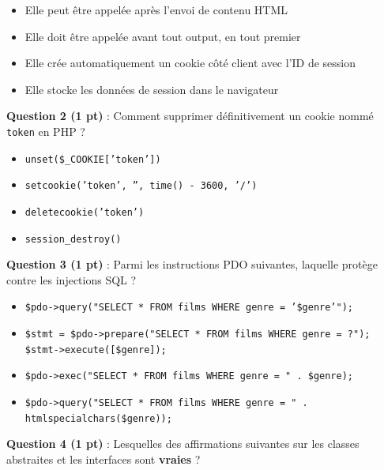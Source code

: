 \documentclass[11pt,a4paper]{article}
\newcommand{\cb}{$\square$\ }
\begin{document}
\begin{itemize}[leftmargin=2em, itemsep=3pt, topsep=4pt]
  \item[\cb] Elle peut être appelée après l'envoi de contenu HTML
  \item[\cb] Elle doit être appelée avant tout output, en tout premier
  \item[\cb] Elle crée automatiquement un cookie côté client avec l'ID de session
  \item[\cb] Elle stocke les données de session dans le navigateur
\end{itemize}

\vspace{6pt}

\noindent\textbf{Question 2 (1 pt)} : Comment supprimer définitivement un cookie nommé \texttt{token} en PHP ?

\begin{itemize}[leftmargin=2em, itemsep=3pt, topsep=4pt]
  \item[\cb] \texttt{unset(\$\_COOKIE['token'])}
  \item[\cb] \texttt{setcookie('token', '', time() - 3600, '/')}
  \item[\cb] \texttt{deletecookie('token')}
  \item[\cb] \texttt{session\_destroy()}
\end{itemize}

\vspace{6pt}

\noindent\textbf{Question 3 (1 pt)} : Parmi les instructions PDO suivantes, laquelle protège contre les injections SQL ?

\begin{itemize}[leftmargin=2em, itemsep=3pt, topsep=4pt]
  \item[\cb] \texttt{\$pdo->query("SELECT * FROM films WHERE genre = '\$genre'");}
  \item[\cb] \texttt{\$stmt = \$pdo->prepare("SELECT * FROM films WHERE genre = ?"); \$stmt->execute([\$genre]);}
  \item[\cb] \texttt{\$pdo->exec("SELECT * FROM films WHERE genre = " . \$genre);}
  \item[\cb] \texttt{\$pdo->query("SELECT * FROM films WHERE genre = " . htmlspecialchars(\$genre));}
\end{itemize}

\vspace{6pt}

\noindent\textbf{Question 4 (1 pt)} : Lesquelles des affirmations suivantes sur les classes abstraites et les interfaces sont \textbf{vraies} ?
\end{document}

